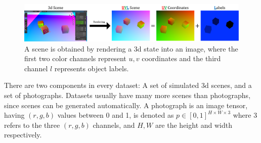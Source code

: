 \documentclass{article}
\begin{document}
	\begin{figure}[H]
	    \vspace{-5pt}
		\begin{center}
			\includegraphics[width=.8\textwidth]{../images/uvl_explanation_minimal.pdf}
		\end{center}
		\vspace{-10pt}
		\caption{
			A scene is obtained by rendering a 3d state into an image, where the first two color channels represent $u,v$ coordinates and the third channel $l$ represents object labels.
			}
		\label{fig:uvl_explanation}
		\vspace{-15pt}
	\end{figure}

	There are two components in every dataset: A set of simulated 3d scenes, and a set of photographs.
	Datasets usually have many more scenes than photographs, since scenes can be generated automatically.
	A photograph is an image tensor, having $(r,g,b)$ values between 0 and 1,
		is denoted as ${p \in [0,1]^{H \times W \times 3}}$ where 
		3 refers to the three $(r,g,b)$ channels, 
		and $H,W$ are the height and width respectively.
		
\end{document}
